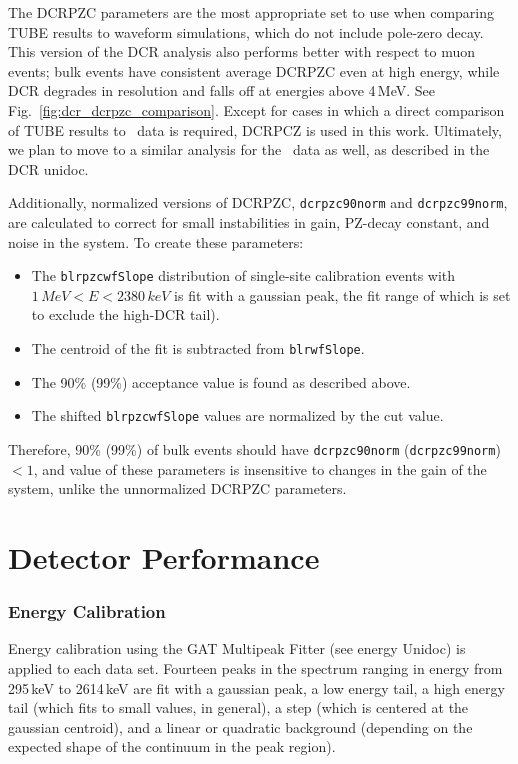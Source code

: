 The DCRPZC parameters are the most appropriate set to use when comparing TUBE results to waveform simulations, which do not include pole-zero decay. This version of the DCR analysis also performs better with respect to muon events; bulk events have consistent average DCRPZC even at high energy, while DCR degrades in resolution and falls off at energies above 4\,MeV. See Fig.~\ref{fig:dcr_dcrpzc_comparison}. Except for cases in which a direct comparison of TUBE results to \MJ\ data is required, DCRPCZ is used in this work. Ultimately, we plan to move to a similar analysis for the \MJ\ data as well, as described in the DCR unidoc. 

Additionally, normalized versions of DCRPZC, {\tt dcrpzc90norm} and {\tt dcrpzc99norm}, are calculated to correct for small instabilities in gain, PZ-decay constant, and noise in the system. To create these parameters:
\begin{itemize}
\item The {\tt blrpzcwfSlope} distribution of single-site calibration events with $1\,MeV< E < 2380\,keV$ is fit with a gaussian peak, the fit range of which is set to exclude the high-DCR tail). 
\item The centroid of the fit is subtracted from {\tt blrwfSlope}.
\item The 90\% (99\%) acceptance value is found as described above.
\item The shifted {\tt blrpzcwfSlope} values are normalized by the cut value.
\end{itemize}

Therefore, 90\% (99\%) of bulk events should have {\tt dcrpzc90norm} ({\tt dcrpzc99norm}) $< 1$, and value of these parameters is insensitive to changes in the gain of the system, unlike the unnormalized DCRPZC parameters.  

\section{Detector Performance}
\subsubsection{Energy Calibration}
Energy calibration using the GAT Multipeak Fitter (see energy Unidoc) is applied to each data set. Fourteen peaks in the spectrum ranging in energy from 295\,keV to 2614\,keV are fit with a gaussian peak, a low energy tail, a high energy tail (which fits to small values, in general), a step (which is centered at the gaussian centroid), and a linear or quadratic background (depending on the expected shape of the continuum in the peak region).

